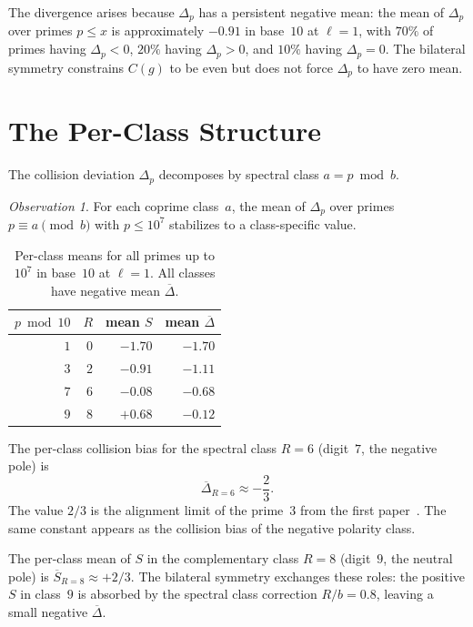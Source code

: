\documentclass[12pt]{amsart}
\theoremstyle{definition}
\theoremstyle{remark}
\newtheorem{observation}[theorem]{Observation}
\begin{document}
The divergence arises because $\Delta_p$ has a persistent
negative mean: the mean of $\Delta_p$ over primes
$p \le x$ is approximately $-0.91$ in base~$10$ at $\ell = 1$,
with $70\%$ of primes having $\Delta_p < 0$, $20\%$ having
$\Delta_p > 0$, and $10\%$ having $\Delta_p = 0$. The
bilateral symmetry constrains $C(g)$ to be even but does not
force $\Delta_p$ to have zero mean.

\section{The Per-Class Structure}

The collision deviation $\Delta_p$ decomposes by spectral
class $a = p \bmod b$.

\begin{observation}\label{obs:class-means}
For each coprime class~$a$, the mean of $\Delta_p$ over
primes $p \equiv a \pmod{b}$ with $p \le 10^7$ stabilizes
to a class-specific value.

\begin{table}[h]
\centering
\begin{tabular}{rrrr}
\toprule
$p \bmod 10$ & $R$ & mean $S$ & mean $\overline{\Delta}$ \\
\midrule
$1$ & $0$ & $-1.70$ & $-1.70$ \\
$3$ & $2$ & $-0.91$ & $-1.11$ \\
$7$ & $6$ & $-0.08$ & $-0.68$ \\
$9$ & $8$ & $+0.68$ & $-0.12$ \\
\bottomrule
\end{tabular}
\caption{Per-class means for all primes up to $10^7$
in base~$10$ at $\ell = 1$. All classes have negative mean
$\overline{\Delta}$.}
\label{tab:class-means}
\end{table}
\end{observation}

The per-class collision bias for the spectral class $R = 6$
(digit~$7$, the negative pole) is
\[
\overline{\Delta}_{R=6} \approx -\frac{2}{3}.
\]
The value $2/3$ is the alignment limit of the prime~$3$ from
the first paper~\cite{paper1}. The same constant appears as
the collision bias of the negative polarity class.

The per-class mean of $S$ in the complementary class $R = 8$
(digit~$9$, the neutral pole) is $\overline{S}_{R=8} \approx
+2/3$. The bilateral symmetry exchanges these roles: the
positive $S$ in class~$9$ is absorbed by the spectral class
correction $R/b = 0.8$, leaving a small negative
$\overline{\Delta}$.
\end{document}
